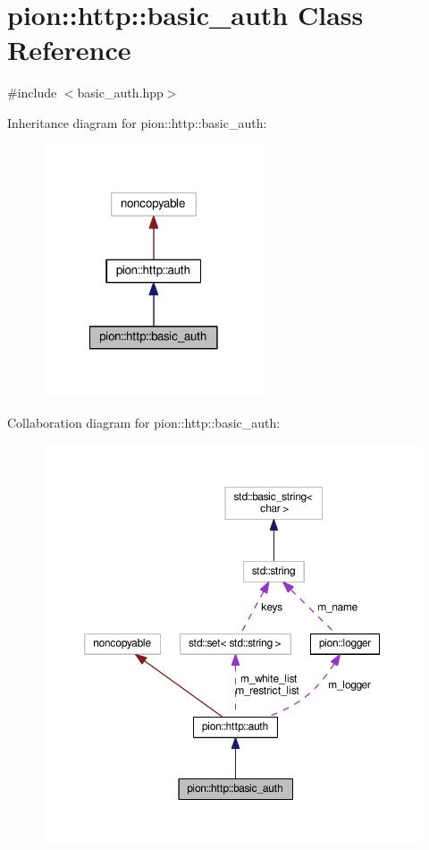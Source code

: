 \hypertarget{classpion_1_1http_1_1basic__auth}{\section{pion\-:\-:http\-:\-:basic\-\_\-auth Class Reference}
\label{classpion_1_1http_1_1basic__auth}
}


{\ttfamily \#include $<$basic\-\_\-auth.\-hpp$>$}



Inheritance diagram for pion\-:\-:http\-:\-:basic\-\_\-auth\-:
\nopagebreak
\begin{figure}[H]
\begin{center}
\leavevmode
\includegraphics[width=186pt]{classpion_1_1http_1_1basic__auth__inherit__graph}
\end{center}
\end{figure}


Collaboration diagram for pion\-:\-:http\-:\-:basic\-\_\-auth\-:
\nopagebreak
\begin{figure}[H]
\begin{center}
\leavevmode
\includegraphics[width=350pt]{classpion_1_1http_1_1basic__auth__coll__graph}
\end{center}
\end{figure}
